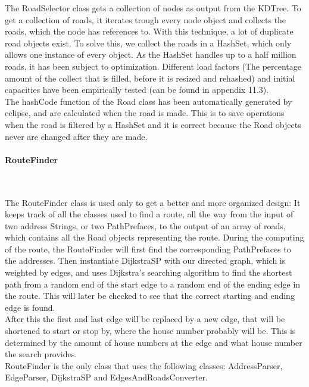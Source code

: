 \documentclass[a4paper,10pt,titlepage]{article}
\begin{document}
The RoadSelector class gets a collection of nodes as output from the KDTree. To get a collection of roads, it iterates trough every node object and collects the roads, which the node has references to. With this technique, a lot of duplicate road objects exist. To solve this, we collect the roads in a HashSet, which only allows one instance of every object. As the HashSet handles up to a half million roads, it has been subject to optimization. Different load factors (The percentage amount of the collect that is filled, before it is resized and rehashed) and initial capacities have been empirically tested (can be found in appendix 11.3).\\

The hashCode function of the Road class has been automatically generated by eclipse, and are calculated when the road is made. This is to save operations when the road is filtered by a HashSet and it is correct because the Road objects never are changed after they are made.
				
				\paragraph{RouteFinder}\mbox{}\
				
The RouteFinder class is used only to get a better and more organized design: It keeps track of all the classes used to find a route, all the way from the input of two address Strings, or two PathPrefaces, to the output of an array of roads, which contains all the Road objects representing the route. During the computing of the route, the RouteFinder will first find the corresponding PathPrefaces to the addresses. Then instantiate DijkstraSP with our directed graph, which is weighted by edges, and uses Dijkstra’s searching algorithm to find the shortest path from a random end of the start edge to a random end of the ending edge in the route. This will later be checked to see that the correct starting and ending edge is found.\\
After this the first and last edge will be replaced by a new edge, that will be shortened to start or stop by, where the house number probably will be. This is determined by the amount of house numbers at the edge and what house number the search provides.\\
RouteFinder is the only class that uses the following classes: AddressParser,  EdgeParser, DijkstraSP and EdgesAndRoadsConverter.\\
\end{document}
